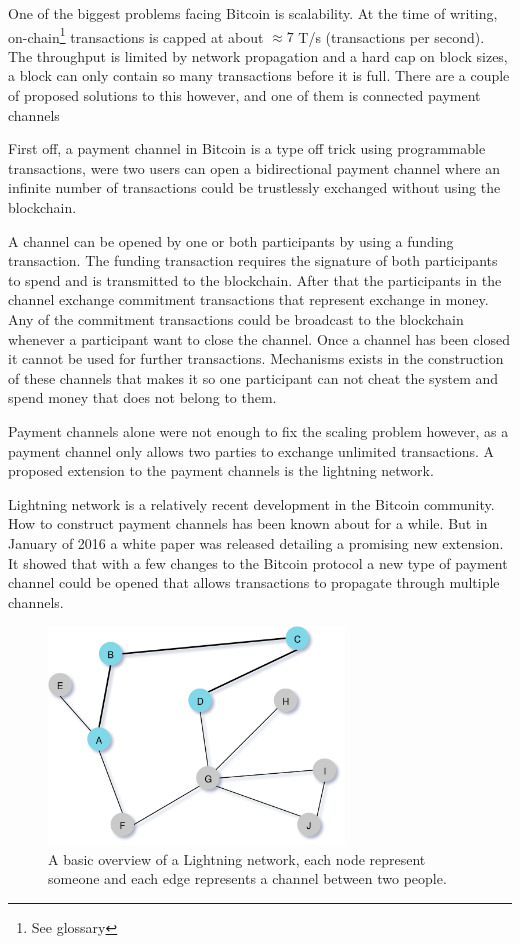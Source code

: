 
One of the biggest problems facing Bitcoin is scalability. At the time of writing,
on-chain\footnote{See glossary} transactions is capped at about $\approx 7$ T/s (transactions per second).\cite{scaling}
The throughput is limited by network propagation and a hard cap on block sizes, a block
can only contain so many transactions before it is full. There are a couple of
proposed solutions to this however, and one of them is connected payment channels

First off, a payment channel in Bitcoin is a type off trick using programmable transactions,
were two users can open a bidirectional payment channel where an infinite number of transactions
could be trustlessly exchanged without using the blockchain.

A channel can be opened by one or both participants by using a funding transaction. The funding
transaction requires the signature of both participants to spend and is transmitted to the blockchain.
After that the participants in the channel exchange commitment transactions that represent exchange in money.
Any of the commitment transactions could be broadcast to the blockchain whenever a participant
want to close the channel. Once a channel has been closed it cannot be used for further transactions.
Mechanisms exists in the construction of these channels that makes it so one participant
can not cheat the system and spend money that does not belong to them.

Payment channels alone were not enough to fix the scaling problem however, as a payment channel
only allows two parties to exchange unlimited transactions. A proposed extension to the
payment channels is the lightning network.

Lightning network is a relatively recent development in the Bitcoin community.
How to construct payment channels has been known about for a while. But in
January of 2016 a white paper was released detailing a promising new extension.\cite{lightningnetwork_2019}
It showed that with a few changes to the Bitcoin protocol a new type of
payment channel could be opened that allows transactions to propagate through multiple channels.\cite{lightningnetwork_2019}

\begin{figure}[H]
	\centering
	\includegraphics[width=0.70\textwidth]{introduction/images/mesh_network.png}
	\caption{A basic overview of a Lightning network, each node represent someone
	and each edge represents a channel between two people.}
	\label{fig:mesh}
\end{figure}

